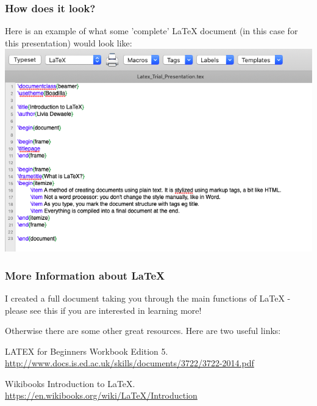 \documentclass{beamer}
\begin{document}
\begin{frame}
\frametitle{How does it look?}
Here is an example of what some 'complete' LaTeX document (in this case for this presentation) would look like:
\includegraphics[scale=0.4]{lateximage.png}



\end{frame}


\begin{frame}
\frametitle{More Information about LaTeX}

I created a full document taking you through the main functions of LaTeX - please see this if you are interested in learning more!

Otherwise there are some other great resources. Here are two useful links: 

LATEX for Beginners Workbook Edition 5.
\hyperlink{LATEX for Beginners Workbook Edition 5} {http://www.docs.is.ed.ac.uk/skills/documents/3722/3722-2014.pdf}

Wikibooks Introduction to LaTeX.
\hyperlink{Wikibooks Introduction to LaTeX} {https://en.wikibooks.org/wiki/LaTeX/Introduction}

\end{frame}
	
	
	
	
	
	
\end{document}
